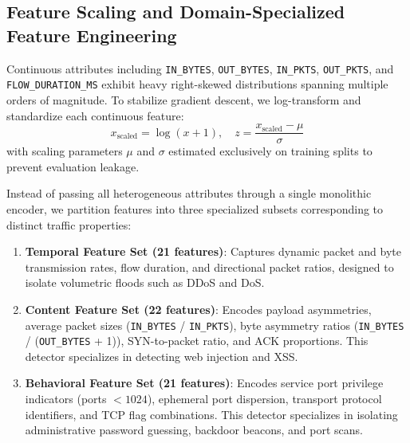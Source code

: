 \documentclass[12pt,a4paper]{report}
\begin{document}
\subsection{Feature Scaling and Domain-Specialized Feature Engineering}
Continuous attributes including \texttt{IN\_BYTES}, \texttt{OUT\_BYTES}, \texttt{IN\_PKTS}, \texttt{OUT\_PKTS}, and \texttt{FLOW\_DURATION\_MS} exhibit heavy right-skewed distributions spanning multiple orders of magnitude. To stabilize gradient descent, we log-transform and standardize each continuous feature:
\begin{equation}
x_{\text{scaled}} = \log(x + 1), \quad z = \frac{x_{\text{scaled}} - \mu}{\sigma}
\end{equation}
with scaling parameters $\mu$ and $\sigma$ estimated exclusively on training splits to prevent evaluation leakage.

Instead of passing all heterogeneous attributes through a single monolithic encoder, we partition features into three specialized subsets corresponding to distinct traffic properties:
\begin{enumerate}
    \item \textbf{Temporal Feature Set (21 features)}: Captures dynamic packet and byte transmission rates, flow duration, and directional packet ratios, designed to isolate volumetric floods such as DDoS and DoS.
    \item \textbf{Content Feature Set (22 features)}: Encodes payload asymmetries, average packet sizes (\texttt{IN\_BYTES} / \texttt{IN\_PKTS}), byte asymmetry ratios (\texttt{IN\_BYTES} / (\texttt{OUT\_BYTES} + 1)), SYN-to-packet ratio, and ACK proportions. This detector specializes in detecting web injection and XSS.
    \item \textbf{Behavioral Feature Set (21 features)}: Encodes service port privilege indicators (ports $< 1024$), ephemeral port dispersion, transport protocol identifiers, and TCP flag combinations. This detector specializes in isolating administrative password guessing, backdoor beacons, and port scans.
\end{enumerate}
\end{document}
